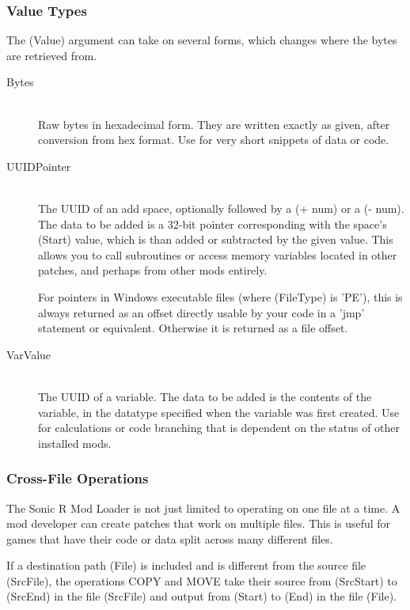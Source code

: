 \documentclass[12pt,a4paper,notitlepage]{article}
\begin{document}
\subsubsection{Value Types}
\label{subsubsec:works-patch-value}
The (Value) argument can take on several forms, which changes where the bytes are retrieved from.

\begin{description}
\item[Bytes] \hfill \\ 
	Raw bytes in hexadecimal form. They are written exactly as given, after conversion from hex format. Use for very short snippets of data or code.
\item[UUIDPointer] \hfill \\
	The UUID of an add space, optionally followed by a (+ num) or a (- num). The data to be added is a 32-bit pointer corresponding with the space's (Start) value, which is than added or subtracted by the given value. This allows you to call subroutines or access memory variables located in other patches, and perhaps from other mods entirely.
	
	For pointers in Windows executable files (where (FileType) is 'PE'), this is always returned as an offset directly usable by your code in a 'jmp' statement or equivalent. Otherwise it is returned as a file offset.
\item[VarValue] \hfill \\
	The UUID of a variable. The data to be added is the contents of the variable, in the datatype specified when the variable was first created. Use for calculations or code branching that is dependent on the status of other installed mods.
\end{description}

\subsubsection{Cross-File Operations}
\label{subsubsec:works-patch-crossfile}
The Sonic R Mod Loader is not just limited to operating on one file at a time. A mod developer can create patches that work on multiple files. This is useful for games that have their code or data split across many different files.

If a destination path (File) is included and is different from the source file (SrcFile), the operations COPY and MOVE take their source from (SrcStart) to (SrcEnd) in the file (SrcFile) and output from (Start) to (End) in the file (File).
\end{document}
